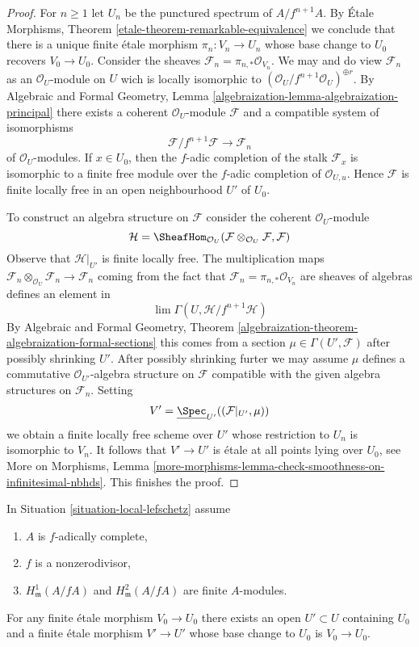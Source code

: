 \begin{proof}
For $n \geq 1$ let $U_n$ be the punctured spectrum of $A/f^{n + 1}A$.
By \'Etale Morphisms, Theorem \ref{etale-theorem-remarkable-equivalence}
we conclude that there is a unique finite \'etale morphism
$\pi_n : V_n \to U_n$ whose base change to $U_0$ recovers $V_0 \to U_0$.
Consider the sheaves $\mathcal{F}_n = \pi_{n, *}\mathcal{O}_{V_n}$.
We may and do view $\mathcal{F}_n$ as an $\mathcal{O}_U$-module on $U$
wich is locally isomorphic to
$(\mathcal{O}_U/f^{n + 1}\mathcal{O}_U)^{\oplus r}$. By
Algebraic and Formal Geometry, Lemma
\ref{algebraization-lemma-algebraization-principal}
there exists a coherent $\mathcal{O}_U$-module $\mathcal{F}$
and a compatible system of isomorphisms
$$
\mathcal{F}/f^{n + 1}\mathcal{F} \to \mathcal{F}_n
$$
of $\mathcal{O}_U$-modules. If $x \in U_0$, then the $f$-adic
completion of the stalk $\mathcal{F}_x$ is isomorphic to
a finite free module over the $f$-adic completion of $\mathcal{O}_{U, u}$.
Hence $\mathcal{F}$ is finite locally free in an open neighbourhood
$U'$ of $U_0$.

\medskip\noindent
To construct an algebra structure on $\mathcal{F}$ consider the coherent
$\mathcal{O}_U$-module
$$
\mathcal{H} = \SheafHom_{\mathcal{O}_U}(
\mathcal{F}\otimes_{\mathcal{O}_U} \mathcal{F}, \mathcal{F})
$$
Observe that $\mathcal{H}|_{U'}$ is finite locally free. The multiplication
maps
$\mathcal{F}_n \otimes_{\mathcal{O}_U} \mathcal{F}_n \to \mathcal{F}_n$
coming from the fact that $\mathcal{F}_n = \pi_{n, *}\mathcal{O}_{V_n}$
are sheaves of algebras defines an element in
$$
\lim \Gamma(U, \mathcal{H}/f^{n + 1}\mathcal{H})
$$
By Algebraic and Formal Geometry, Theorem
\ref{algebraization-theorem-algebraization-formal-sections}
this comes from a section $\mu \in \Gamma(U', \mathcal{F})$
after possibly shrinking $U'$. After possibly shrinking furter
we may assume $\mu$ defines a commutative $\mathcal{O}_{U'}$-algebra
structure on $\mathcal{F}$ compatible with the given algebra
structures on $\mathcal{F}_n$.
Setting
$$
V' = \underline{\Spec}_{U'}((\mathcal{F}|_{U'}, \mu))
$$
we obtain a finite locally free scheme over $U'$ whose restriction
to $U_n$ is isomorphic to $V_n$. It follows that $V' \to U'$
is \'etale at all points lying over $U_0$, see
More on Morphisms, Lemma
\ref{more-morphisms-lemma-check-smoothness-on-infinitesimal-nbhds}.
This finishes the proof.
\end{proof}

\begin{lemma}
\label{lemma-essentially-surjective-general}
In Situation \ref{situation-local-lefschetz} assume
\begin{enumerate}
\item $A$ is $f$-adically complete,
\item $f$ is a nonzerodivisor,
\item $H^1_\mathfrak m(A/fA)$ and $H^2_\mathfrak m(A/fA)$
are finite $A$-modules.
\end{enumerate}
For any finite \'etale morphism $V_0 \to U_0$ there exists an open
$U' \subset U$ containing $U_0$ and a finite \'etale morphism
$V' \to U'$ whose base change to $U_0$ is $V_0 \to U_0$.
\end{lemma}

